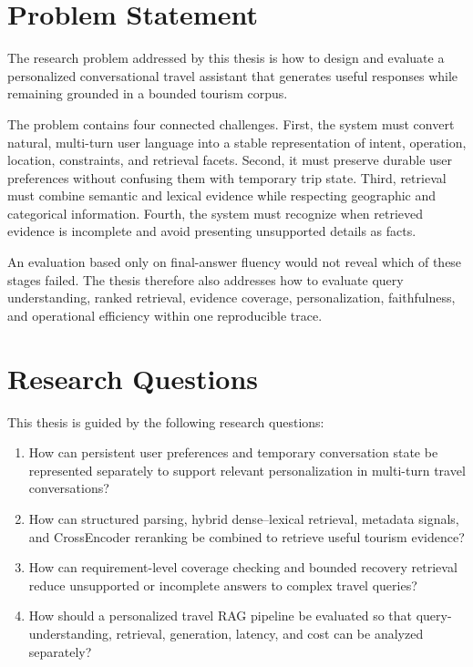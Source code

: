 \section{Problem Statement}

The research problem addressed by this thesis is how to design and evaluate a
personalized conversational travel assistant that generates useful responses
while remaining grounded in a bounded tourism corpus.

The problem contains four connected challenges. First, the system must convert
natural, multi-turn user language into a stable representation of intent,
operation, location, constraints, and retrieval facets. Second, it must preserve
durable user preferences without confusing them with temporary trip state.
Third, retrieval must combine semantic and lexical evidence while respecting
geographic and categorical information. Fourth, the system must recognize when
retrieved evidence is incomplete and avoid presenting unsupported details as
facts.

An evaluation based only on final-answer fluency would not reveal which of these
stages failed. The thesis therefore also addresses how to evaluate query
understanding, ranked retrieval, evidence coverage, personalization,
faithfulness, and operational efficiency within one reproducible trace.

\section{Research Questions}

This thesis is guided by the following research questions:

\begin{enumerate}[label=\textbf{RQ\arabic*:}]
    \item How can persistent user preferences and temporary conversation state
    be represented separately to support relevant personalization in multi-turn
    travel conversations?

    \item How can structured parsing, hybrid dense--lexical retrieval, metadata
    signals, and CrossEncoder reranking be combined to retrieve useful tourism
    evidence?

    \item How can requirement-level coverage checking and bounded recovery
    retrieval reduce unsupported or incomplete answers to complex travel
    queries?

    \item How should a personalized travel RAG pipeline be evaluated so that
    query-understanding, retrieval, generation, latency, and cost can be
    analyzed separately?
\end{enumerate}

